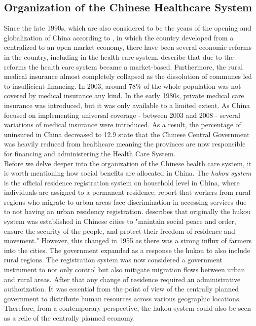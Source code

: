 \documentclass[
]{article}
\begin{document}
	\subsection{Organization of the Chinese Healthcare System} \label{orga}
	Since the late 1990s, which are also considered to be the years of the opening and globalization of China according to \cite{kanbur_fifty_2005}, in which the country developed from a centralized to an open market economy, there have been several economic reforms in the country, including in the health care system.
    \cite{shi_health_2018} describe that due to the reforms the health care system became a market-based. Furthermore, the rural medical insurance almost completely collapsed as the dissolution of communes led to insufficient financing. In 2003, around 78\% of the whole population was not covered by medical insurance any kind. In the early 1980s, private medical care insurance was introduced, but it was only available to a limited extent.
	As China focused on implementing universal coverage - between 2003 and 2008 - several variations of medical insurance were introduced. As a result, the percentage of uninsured in China decreased to 12.9%
	 \cite{hougaard_chinese_2011} state that the Chinese Central Government was heavily reduced from healthcare meaning the provinces are now responsible for financing and administering the Health Care System. \\
	Before we delve deeper into the organization of the Chinese health care system, it is worth mentioning how social benefits are allocated in China.
	The \textit{hukou system} is the official residence registration system on household level in China, where individuals are assigned to a permanent residence.
	\cite{noauthor_oecd_nodate} report that workers from rural regions who migrate to urban areas face discrimination in accessing services due to not having an urban residency registration.
	\cite{liu_institution_2005} describes  that originally the hukou system was established in Chinese cities to "maintain social peace and order, ensure the security of the people, and protect their freedom of residence and movement."
	However, this changed in 1955 as there was a strong influx of farmers into the cities. The government expanded as a response the hukou to also include rural regions.
    The registration system was now considered a government instrument to not only control but also mitigate migration flows between urban and rural areas. After that any change of residence required an administrative authorization. It was essential from the point of view of the centrally planned government to distribute human resources across various geographic locations. Therefore, from a contemporary perspective, the hukou system could also be seen as a relic of the centrally planned economy.
\end{document}
